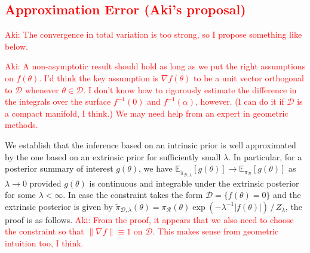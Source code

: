 \documentclass[10pt]{article}
\newcommand{\leo}[1]{{\color{blue}{Leo: #1}}}
\newcommand{\aki}[1]{\textcolor{red}{Aki: #1}}
\newcommand{\mc}[1]{\mathcal{#1}}
\DeclareMathOperator{\1}{\mathbbm{1}}
\begin{document}
\subsection{\textcolor{red}{Approximation Error (Aki's proposal)}}

\aki{The convergence in total variation is too strong, so I propose something like below.}

\leo{Aki, I like your use of Feder's co-area forumula, can we get some non-asympotic result when $\lambda>m$ (away from 0)?}

\aki{A non-asymptotic result should hold as long as we put the right assumptions on $f(\theta)$. I'd think the key assumption is $\nabla f(\theta)$ to be a unit vector orthogonal to $\mc D$ whenever $\theta \in \mc D$. I don't know how to rigorously estimate the difference in the integrals over the surface $f^{-1}(0)$ and $f^{-1}(\alpha)$, however. (I can do it if $\mc D$ is a compact manifold, I think.) We may need help from an expert in geometric methods.}



\newcommand{\tilpi}{\tilde{\pi}}

We establish that the inference based on an intrinsic prior is well approximated by the one based on an extrinsic prior for sufficiently small $\lambda$. In particular, for a posterior summary of interest $g(\theta)$, we have $\mathbb{E}_{\tilpi_{\mc D, \lambda}}[g(\theta)] \to \mathbb{E}_{\pi_{\mc D}}[g(\theta)]$ as $\lambda \to 0$ provided $g(\theta)$ is continuous and integrable under the extrinsic posterior for some $\lambda < \infty$. In case the constraint takes the form $\mc D = \{f(\theta) = 0\}$ and the extrinsic posterior is given by $\tilpi_{\mc D, \lambda}(\theta) = \pi_{\mc R}(\theta) \exp(- \lambda^{-1} |f(\theta)|) \, / \, Z_\lambda$, the proof is as follows. \aki{From the proof, it appears that we also need to choose the constraint so that  $\| \nabla f \| \equiv 1$ on $\mc D$. This makes sense from geometric intuition too, I think.}
\end{document}
